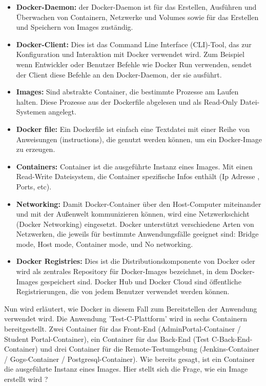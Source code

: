 \documentclass[a4paper,12pt,oneside]{book}
\begin{document}
\begin{itemize}
	\item \textbf{Docker-Daemon: }der Docker-Daemon ist für das Erstellen, Ausführen und Überwachen von Containern, Netzwerke und Volumes sowie für das Erstellen und Speichern von Images zuständig.
	\item \textbf{Docker-Client: }Dies ist das Command Line Interface (CLI)-Tool, das zur Konfiguration und Interaktion mit Docker verwendet wird. Zum Beispiel wenn Entwickler oder Benutzer Befehle wie Docker Run verwenden, sendet der Client diese Befehle an den Docker-Daemon, der sie ausführt.
	\item \textbf{Images: }Sind abstrakte Container, die bestimmte Prozesse am Laufen halten. Diese Prozesse aus der Dockerfile abgelesen und als Read-Only Datei-Systemen angelegt.
	\item \textbf{Docker file: }Ein Dockerfile ist einfach eine Textdatei mit einer Reihe von Anweisungen (instructions), die genutzt werden können, um ein Docker-Image zu erzeugen.
	\item \textbf{Containers: }Container ist die ausgeführte Instanz eines Images. Mit einen Read-Write Dateisystem, die Container spezifische Infos enthält (Ip Adresse , Ports, etc).
	\item \textbf{Networking: }Damit Docker-Container über den Host-Computer miteinander und mit der Außenwelt kommunizieren können, wird eine Netzwerkschicht (Docker Networking) eingesetzt. Docker unterstützt verschiedene Arten von Netzwerken, die jeweils für bestimmte Anwendungsfälle geeignet sind: Bridge mode, Host mode, Container mode, und No networking.
	\item \textbf{Docker Registries: }Dies ist die Distributionskomponente von Docker oder wird als zentrales Repository für Docker-Images bezeichnet, in dem Docker-Images gespeichert sind. Docker Hub und Docker Cloud sind öffentliche Registrierungen, die von jedem Benutzer verwendet werden können. 
\end{itemize}
Nun wird erläutert, wie Docker in diesem Fall zum Bereitstellen der Anwendung verwendet wird. Die Anwendung 'Test-C-Plattform' wird in sechs Containern bereitgestellt. Zwei Container für das Front-End (AdminPortal-Container / Student Portal-Container), ein Container für das Back-End (Test C-Back-End-Container) und drei Container für die Remote-Testumgebung (Jenkins-Container / Gogs-Container / Postgresql-Container).
\newline
Wie bereits gesagt, ist ein Container die ausgeführte Instanz eines Images. Hier stellt sich die Frage, wie ein Image erstellt wird ?
\end{document}
